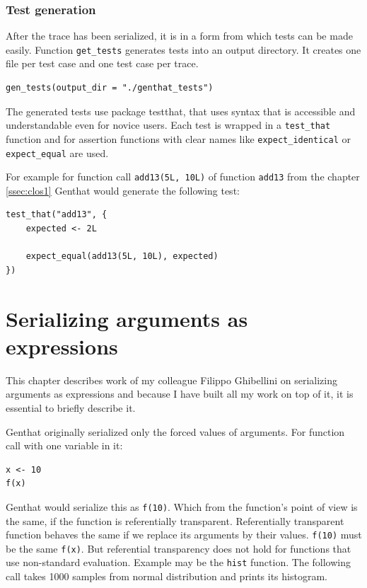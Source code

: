 \documentclass[thesis=B,english]{FITthesis}[2012/10/20]
\begin{document}
\subsection{Test generation}
After the trace has been serialized, it is in a form from which tests can be made easily. Function \verb|get_tests| generates tests into an output directory. It creates one file per test case and one test case per trace. 

\begin{verbatim}
gen_tests(output_dir = "./genthat_tests")
\end{verbatim}

The generated tests use package testthat, that uses syntax that is accessible and understandable even for novice users. Each test is wrapped in a \verb|test_that| function and for assertion functions with clear names like \verb|expect_identical| or \verb|expect_equal| are used.

For example for function call \verb|add13(5L, 10L)| of function \verb|add13| from the chapter \ref{ssec:clos1} Genthat would generate the following test:

\begin{verbatim}
test_that("add13", {
    expected <- 2L

    expect_equal(add13(5L, 10L), expected)
})
\end{verbatim}

\chapter{Serializing arguments as expressions} \label{chap:args}
This chapter describes work of my colleague Filippo Ghibellini on serializing arguments as expressions and because I have built all my work on top of it, it is essential to briefly describe it.

Genthat originally serialized only the forced values of arguments. For function call with one variable in it:

\begin{verbatim}
x <- 10
f(x)
\end{verbatim}

Genthat would serialize this as \verb|f(10)|. Which from the function’s point of view is the same, if the function is referentially transparent. Referentially transparent function behaves the same if we replace its arguments by their values. \verb|f(10)| must be the same \verb|f(x)|. But referential transparency does not hold for functions that use non-standard evaluation. Example may be the \verb|hist| function. The following call takes 1000 samples from normal distribution and prints its histogram.
\end{document}
